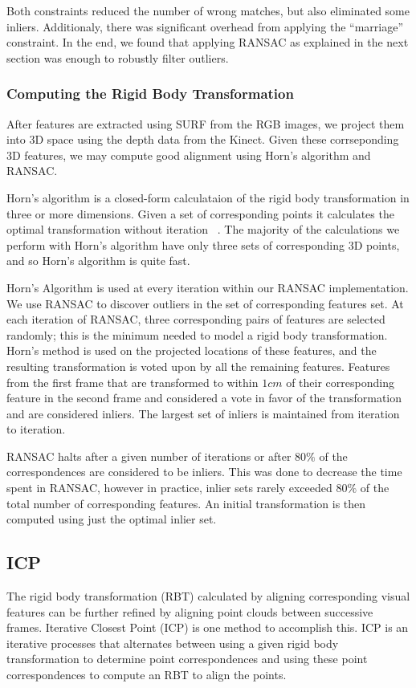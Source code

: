 \documentclass[letterpaper, 10pt, conference]{ieeeconf}
\begin{document}
Both constraints reduced the number of wrong matches, but also eliminated some inliers.
Additionaly, there was significant overhead from applying the ``marriage'' constraint.
In the end, we found that applying RANSAC as explained in the next section was enough
to robustly filter outliers.

\subsubsection{Computing the Rigid Body Transformation}
\label{ransac}
After features are extracted using SURF from the RGB images, we project
them into 3D space using the depth data from the Kinect. Given these
corrseponding 3D features, we may compute good alignment using Horn's
algorithm and RANSAC.

Horn's algorithm is a closed-form calculataion of the rigid body
transformation in three or more dimensions.  Given a set of corresponding
points it calculates the optimal transformation without iteration
~\cite{horn1987closed}.  The majority of the calculations we perform with
Horn's algorithm have only three sets of corresponding 3D points, and so
Horn's algorithm is quite fast.

Horn's Algorithm is used at every iteration within our RANSAC implementation.
We use RANSAC to discover outliers in the set of corresponding features
set.  At each iteration of RANSAC, three corresponding pairs of features
are selected randomly; this is the minimum needed to model a rigid body
transformation.  Horn's method is used on the projected locations of these
features, and the resulting transformation is voted upon by all the remaining
features.  Features from the first frame that are transformed to within $1cm$
of their corresponding feature in the second frame and considered a vote in
favor of the transformation and are considered inliers.  The largest set of
inliers is maintained from iteration to iteration.

RANSAC halts after a given number of iterations or after $80\%$ of the
correspondences are considered to be inliers.  This was done to decrease
the time spent in RANSAC, however in practice, inlier sets rarely exceeded
$80\%$ of the total number of corresponding features.  An initial
transformation is then computed using just the optimal inlier set.

\subsection{ICP}
	The rigid body transformation (RBT) calculated by aligning corresponding visual features can be further refined by aligning point clouds between successive frames.  Iterative Closest Point (ICP) is one method to accomplish this.  ICP is an iterative processes that alternates between using a given rigid body transformation to determine point correspondences and using these point correspondences to compute an RBT to align the points.  \newline
\end{document}
